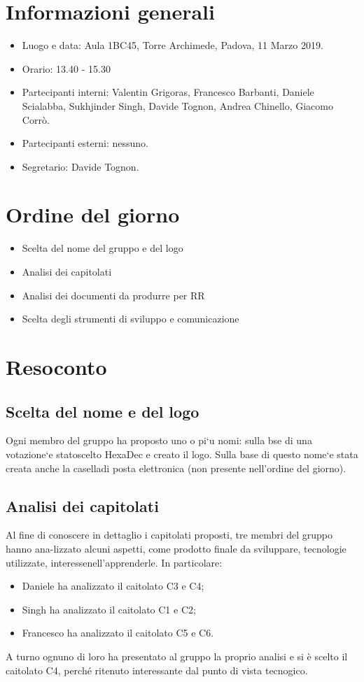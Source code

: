 \section{Informazioni generali}
\begin{itemize}
    \item Luogo e data: Aula 1BC45, Torre Archimede, Padova, 11 Marzo 2019.
    \item Orario: 13.40 - 15.30
    \item Partecipanti interni: Valentin Grigoras, Francesco Barbanti, Daniele Scialabba, Sukhjinder Singh, Davide Tognon, Andrea Chinello, Giacomo Corrò.
    \item Partecipanti esterni: nessuno.
    \item Segretario: Davide Tognon.
\end{itemize}

\section{Ordine del giorno}
\begin{itemize}
    \item Scelta del nome del gruppo e del logo
    \item Analisi dei capitolati
    \item Analisi dei documenti da produrre per RR
    \item Scelta degli strumenti di sviluppo e comunicazione
\end{itemize}

\section{Resoconto}
\subsection{Scelta del nome e del logo}
Ogni membro del gruppo ha proposto uno o pi`u nomi: sulla bse di una votazione`e statoscelto HexaDec e creato il logo. Sulla base di questo nome`e stata creata anche la caselladi posta elettronica \groupEmail (non presente nell’ordine del giorno).
\subsection{Analisi dei capitolati}
Al fine di conoscere in dettaglio i capitolati proposti, tre membri del gruppo hanno ana-lizzato alcuni aspetti, come prodotto finale da sviluppare, tecnologie utilizzate, interessenell’apprenderle. In particolare:
\begin{itemize}
    \item Daniele ha analizzato il caitolato C3 e C4;
    \item Singh ha analizzato il caitolato C1 e C2;
    \item Francesco ha analizzato il caitolato C5 e C6.
\end{itemize}
A turno ognuno di loro ha presentato al gruppo la proprio analisi e si è scelto il caitolato C4, perché ritenuto interessante dal punto di vista tecnogico.

